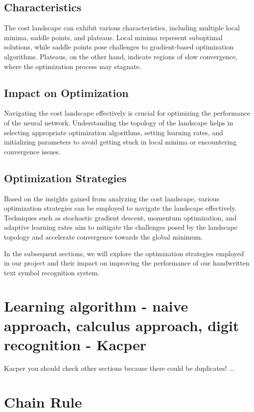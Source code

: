 \documentclass{article}
\begin{document}
\subsection{Characteristics}
The cost landscape can exhibit various characteristics, including multiple local minima, saddle points, and plateaus. Local minima represent suboptimal solutions, while saddle points pose challenges to gradient-based optimization algorithms. Plateaus, on the other hand, indicate regions of slow convergence, where the optimization process may stagnate.

\subsection{Impact on Optimization}
Navigating the cost landscape effectively is crucial for optimizing the performance of the neural network. Understanding the topology of the landscape helps in selecting appropriate optimization algorithms, setting learning rates, and initializing parameters to avoid getting stuck in local minima or encountering convergence issues.

\subsection{Optimization Strategies}
Based on the insights gained from analyzing the cost landscape, various optimization strategies can be employed to navigate the landscape effectively. Techniques such as stochastic gradient descent, momentum optimization, and adaptive learning rates aim to mitigate the challenges posed by the landscape topology and accelerate convergence towards the global minimum.

In the subsequent sections, we will explore the optimization strategies employed in our project and their impact on improving the performance of our handwritten text symbol recognition system.

\newpage
\section{Learning algorithm - naive approach, calculus approach, digit recognition - Kacper}
Kacper you should check other sections because there could be duplicates!
...

\newpage
\section{Chain Rule}
\end{document}
